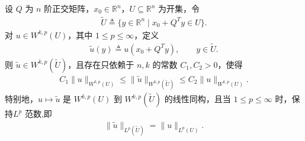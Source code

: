 \documentclass[../../main.tex]{subfiles}%
\begin{document}
\begin{lemma}\label{lemma:正交变换Wkp等价}
设 $Q$ 为 $n$ 阶正交矩阵，$x_0\in\mathbb R^n$，$U\subseteq\mathbb R^n$ 为开集，令
\begin{align*}
\widetilde U\triangleq\{y\in\mathbb R^n\mid x_0+Q^T y\in U\}.
\end{align*}
对 $u\in W^{k,p}(U)$，其中 $1\leqslant p\leqslant\infty$，定义
\begin{align*}
\tilde u(y)\triangleq u(x_0+Q^T y),\qquad y\in\widetilde U.
\end{align*}
则 $\tilde u\in W^{k,p}(\widetilde U)$，且存在只依赖于 $n,k$ 的常数 $C_1,C_2>0$，使得
\begin{align*}
C_1\|u\|_{W^{k,p}(U)}\leqslant\|\tilde u\|_{W^{k,p}(\widetilde U)}\leqslant C_2\|u\|_{W^{k,p}(U)}.
\end{align*}
特别地，$u\mapsto\tilde u$ 是 $W^{k,p}(U)$ 到 $W^{k,p}(\widetilde U)$ 的线性同构，且当 $1\leqslant p\leqslant \infty$ 时，保持$L^p$ 范数,即
\begin{align*}
\|\tilde u\|_{L^p(\widetilde U)}=\|u\|_{L^p(U)}.
\end{align*}
\end{lemma}
\end{document}
